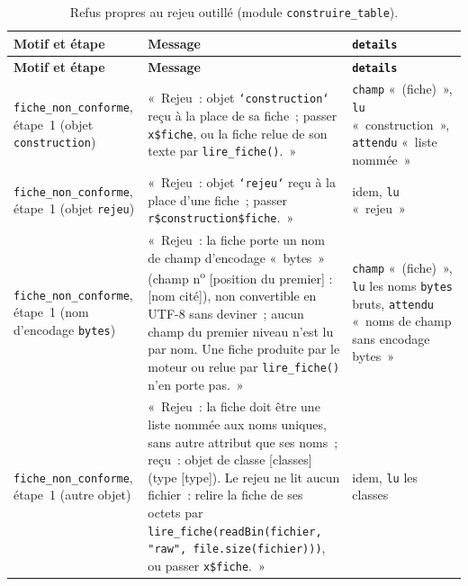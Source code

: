 \documentclass[a4paper,11pt]{article}
\newcommand{\code}[1]{\texttt{\small #1}}
\begin{document}
{\footnotesize
{}
\begin{longtable}{@{}p{5.5cm}p{6.7cm}p{2.4cm}@{}}
\caption{Refus propres au rejeu outillé (module \code{construire\_table}).}
\label{tab:refus-rejeu}\\
\rowcolor{tableheader}
\textcolor{financeblue}{\textbf{Motif et étape}} &
\textcolor{financeblue}{\textbf{Message}} &
\textcolor{financeblue}{\textbf{\code{details}}} \\
\endfirsthead
\rowcolor{tableheader}
\textcolor{financeblue}{\textbf{Motif et étape}} &
\textcolor{financeblue}{\textbf{Message}} &
\textcolor{financeblue}{\textbf{\code{details}}} \\
\endhead
\code{fiche\_non\_conforme}, étape~1 (objet \code{construction}) & «~Rejeu~: objet \code{`construction`} reçu à la place de sa fiche~; passer \code{x\$fiche}, ou la fiche relue de son texte par \code{lire\_fiche()}.~» & \code{champ} «~(fiche)~», \code{lu} «~construction~», \code{attendu} «~liste nommée~» \\
\code{fiche\_non\_conforme}, étape~1 (objet \code{rejeu}) & «~Rejeu~: objet \code{`rejeu`} reçu à la place d'une fiche~; passer \code{r\$construction\$fiche}.~» & idem, \code{lu} «~rejeu~» \\
\code{fiche\_non\_conforme}, étape~1 (nom d'encodage \code{bytes}) & «~Rejeu~: la fiche porte un nom de champ d'encodage «~bytes~» (champ n\textsuperscript{o} [position du premier] : [nom cité]), non convertible en UTF-8 sans deviner~; aucun champ du premier niveau n'est lu par nom. Une fiche produite par le moteur ou relue par \code{lire\_fiche()} n'en porte pas.~» & \code{champ} «~(fiche)~», \code{lu} les noms \code{bytes} bruts, \code{attendu} «~noms de champ sans encodage bytes~» \\
\code{fiche\_non\_conforme}, étape~1 (autre objet) & «~Rejeu~: la fiche doit être une liste nommée aux noms uniques, sans autre attribut que ses noms~; reçu~: objet de classe [classes] (type [type]). Le rejeu ne lit aucun fichier~: relire la fiche de ses octets par \code{lire\_fiche(readBin(fichier, "raw", file.size(fichier)))}, ou passer \code{x\$fiche}.~» & idem, \code{lu} les classes \\

\end{longtable}}
\end{document}
